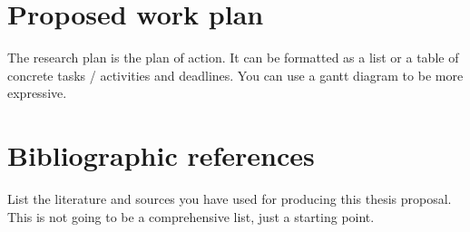 \documentclass[]{cv-style} %
\begin{document}
\section{Proposed work plan}
 \vspace{-0.2cm}

The research plan is the plan of action. It can be formatted as a list or a table of concrete tasks / activities and deadlines. You can use a gantt diagram to be more expressive. 

\section{Bibliographic references}
List the literature and sources you have used for producing this thesis proposal. This is not going to be a comprehensive list, just a starting point.
%
%
\end{document}
